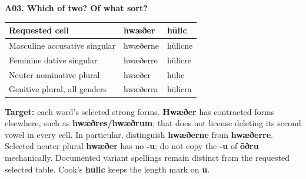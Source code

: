 \par\begin{minipage}{\linewidth}\raggedright
\textbf{A03. Which of two? Of what sort?}

\par\begingroup
\fontsize{10.5}{13.2}\selectfont
\setlength{\LTleft}{0pt}\setlength{\LTright}{\fill}
\noindent
\begin{tabular}{@{}>{\raggedright\arraybackslash}p{56.96mm}>{\raggedright\arraybackslash}p{30.71mm}>{\raggedright\arraybackslash}p{30.71mm}@{}}
\toprule
\textbf{Requested cell} & \textbf{hwæðer} & \textbf{hūlic} \\
\midrule
Masculine accusative singular & hwæðerne & hūlicne \\
Feminine dative singular & hwæðerre & hūlicre \\
Neuter nominative plural & hwæðer & hūlic \\
Genitive plural, all genders & hwæðerra & hūlicra \\
\bottomrule
\end{tabular}
\par\endgroup

\textbf{Target:} each word's selected strong forms. \textbf{Hwæðer} has contracted forms elsewhere, such as \textbf{hwæðres/\allowbreak{}hwæðrum}; that does not license deleting its second vowel in every cell. In particular, distinguish \textbf{hwæðerne} from \textbf{hwæðerre}. Selected neuter plural \textbf{hwæðer} has no \textbf{-u}; do not copy the \textbf{-u} of \textbf{ōðru} mechanically. Documented variant spellings remain distinct from the requested selected table. Cook's \textbf{hūlic} keeps the length mark on \textbf{ū}.

\end{minipage}\par\addvspace{4pt}

